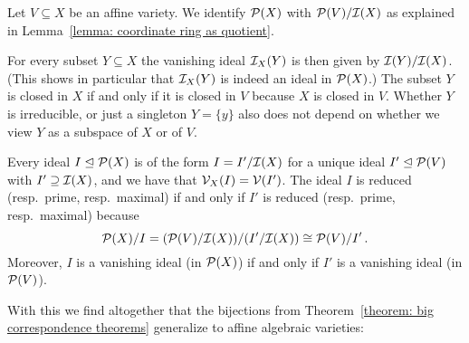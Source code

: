 \begin{fluff}
  Let $V \subseteq X$ be an affine variety.
  We identify $\mathcal{P}(X)$ with $\mathcal{P}(V)/\mathcal{I}(X)$ as explained in Lemma~\ref{lemma: coordinate ring as quotient}.
  
  For every subset $Y \subseteq X$ the vanishing ideal $\mathcal{I}_X(Y)$ is then given by $\mathcal{I}(Y)/\mathcal{I}(X)$.
  (This shows in particular that $\mathcal{I}_X(Y)$ is indeed an ideal in $\mathcal{P}(X)$.)
  The subset $Y$ is closed in $X$ if and only if it is closed in $V$ because $X$ is closed in $V$.
  Whether $Y$ is irreducible, or just a singleton $Y = \{y\}$ also does not depend on whether we view $Y$ as a subspace of $X$ or of $V$.
  
  Every ideal $I \trianglelefteq \mathcal{P}(X)$ is of the form $I = I'/\mathcal{I}(X)$ for a unique ideal $I' \trianglelefteq \mathcal{P}(V)$ with $I' \supseteq \mathcal{I}(X)$, and we have that $\mathcal{V}_X(I) = \mathcal{V}(I')$.
  The ideal $I$ is reduced (resp.\ prime, resp.\ maximal) if and only if $I'$ is reduced (resp.\ prime, resp.\ maximal) because
  \[
          \mathcal{P}(X)/I
    =     ( \mathcal{P}(V)/\mathcal{I}(X) ) / ( I'/\mathcal{I}(X) )
    \cong \mathcal{P}(V)/I' \,.
  \]
  Moreover, $I$ is a vanishing ideal (in $\mathcal{P}(X)$) if and only if $I'$ is a vanishing ideal (in $\mathcal{P}(V)$).
  
  With this we find altogether that the bijections from Theorem~\ref{theorem: big correspondence theorems} generalize to affine algebraic varieties:
\end{fluff}


